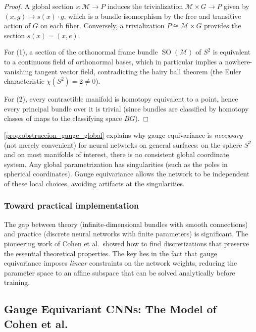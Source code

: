 \begin{proof}
A global section $s: \mathcal{M} \to P$ induces the trivialization $\mathcal{M} \times G \to P$ given by $(x, g) \mapsto s(x) \cdot g$, which is a bundle isomorphism by the free and transitive action of $G$ on each fiber. Conversely, a trivialization $P \cong \mathcal{M} \times G$ provides the section $s(x) = (x, e)$.

For (1), a section of the orthonormal frame bundle $\operatorname{SO}(\mathcal{M})$ of $S^2$ is equivalent to a continuous field of orthonormal bases, which in particular implies a nowhere-vanishing tangent vector field, contradicting the hairy ball theorem (the Euler characteristic $\chi(S^2) = 2 \neq 0$).

For (2), every contractible manifold is homotopy equivalent to a point, hence every principal bundle over it is trivial (since bundles are classified by homotopy classes of maps to the classifying space $BG$).
\end{proof}

\begin{remark}
\autoref{prop:obstruccion_gauge_global} explains why gauge equivariance is \textit{necessary} (not merely convenient) for neural networks on general surfaces: on the sphere $S^2$ and on most manifolds of interest, there is no consistent global coordinate system. Any global parametrization has singularities (such as the poles in spherical coordinates). Gauge equivariance allows the network to be independent of these local choices, avoiding artifacts at the singularities.
\end{remark}

\subsubsection{Toward practical implementation}

The gap between theory (infinite-dimensional bundles with smooth connections) and practice (discrete neural networks with finite parameters) is significant. The pioneering work of Cohen et al.\ showed how to find discretizations that preserve the essential theoretical properties. The key lies in the fact that gauge equivariance imposes \textit{linear} constraints on the network weights, reducing the parameter space to an affine subspace that can be solved analytically before training.

\subsection{Gauge Equivariant CNNs: The Model of Cohen et al.}\label{subsec:modelo_cohen_gauge}

